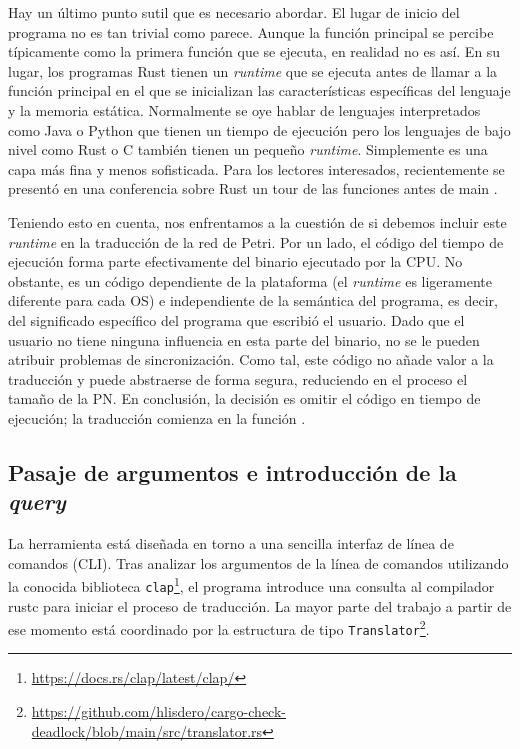 Hay un último punto sutil que es necesario abordar. El lugar de inicio del programa no es tan
trivial como parece. Aunque la función principal  se percibe típicamente como la primera
función que se ejecuta, en realidad no es así. En su lugar, los programas Rust tienen un \textit{runtime}
que se ejecuta antes de llamar a la función principal en el que se inicializan las
características específicas del lenguaje y la memoria estática. Normalmente se oye hablar de
lenguajes interpretados como Java o Python que tienen un tiempo de ejecución pero los
lenguajes de bajo nivel como Rust o C también tienen un pequeño \textit{runtime}.
Simplemente es una capa más fina y menos sofisticada. Para los lectores interesados, recientemente se
presentó en una conferencia sobre Rust un tour de las funciones antes de main \cite{levick2022}.

Teniendo esto en cuenta, nos enfrentamos a la cuestión de si debemos incluir este \textit{runtime}
en la traducción de la red de Petri. Por un lado, el código del tiempo de ejecución forma parte
efectivamente del binario ejecutado por la \acrshort{CPU}. No obstante, es un código dependiente de la
plataforma (el \textit{runtime} es ligeramente diferente para cada \acrshort{OS}) e independiente de
la semántica del programa, es decir, del significado específico del programa que escribió el
usuario. Dado que el usuario no tiene ninguna influencia en esta parte del binario, no se le
pueden atribuir problemas de sincronización. Como tal, este código no añade valor a la
traducción y puede abstraerse de forma segura, reduciendo en el proceso el tamaño de la \acrshort{PN}.
En conclusión, la decisión es omitir el código en tiempo de ejecución; la traducción comienza
en la función .

\subsection{Pasaje de argumentos e introducción de la \textit{query}}

La herramienta está diseñada en torno a una sencilla interfaz de línea de comandos (\acrfull{CLI}).
Tras analizar los argumentos de la línea de comandos utilizando la conocida biblioteca
\texttt{clap}\footnote{\url{https://docs.rs/clap/latest/clap/}}, el
programa introduce una consulta al compilador rustc para iniciar el proceso de traducción.
La mayor parte del trabajo a partir de ese momento está coordinado por la estructura de tipo
\texttt{Translator}\footnote{\url{https://github.com/hlisdero/cargo-check-deadlock/blob/main/src/translator.rs}}.

